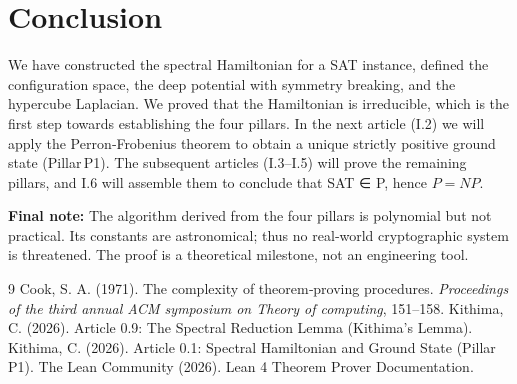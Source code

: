 \documentclass[11pt,a4paper]{article}
\begin{document}
\section{Conclusion}

We have constructed the spectral Hamiltonian for a SAT instance, defined the configuration space, the deep potential with symmetry breaking, and the hypercube Laplacian. We proved that the Hamiltonian is irreducible, which is the first step towards establishing the four pillars. In the next article (I.2) we will apply the Perron‑Frobenius theorem to obtain a unique strictly positive ground state (Pillar P1). The subsequent articles (I.3–I.5) will prove the remaining pillars, and I.6 will assemble them to conclude that SAT ∈ P, hence $P = NP$.

\vspace{0.5cm}
\noindent\textbf{Final note:} The algorithm derived from the four pillars is polynomial but not practical. Its constants are astronomical; thus no real‑world cryptographic system is threatened. The proof is a theoretical milestone, not an engineering tool.


\begin{thebibliography}{9}
  Cook, S. A. (1971). The complexity of theorem‑proving procedures. \emph{Proceedings of the third annual ACM symposium on Theory of computing}, 151–158.
  Kithima, C. (2026). Article 0.9: The Spectral Reduction Lemma (Kithima's Lemma).
  Kithima, C. (2026). Article 0.1: Spectral Hamiltonian and Ground State (Pillar P1).
  The Lean Community (2026). Lean 4 Theorem Prover Documentation.
\end{thebibliography}
\end{document}
